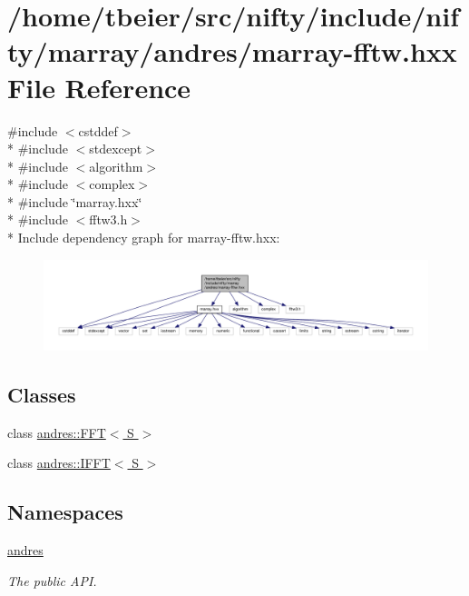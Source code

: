 \hypertarget{marray-fftw_8hxx}{}\section{/home/tbeier/src/nifty/include/nifty/marray/andres/marray-\/fftw.hxx File Reference}
\label{marray-fftw_8hxx}
{\ttfamily \#include $<$cstddef$>$}\\*
{\ttfamily \#include $<$stdexcept$>$}\\*
{\ttfamily \#include $<$algorithm$>$}\\*
{\ttfamily \#include $<$complex$>$}\\*
{\ttfamily \#include \char`\"{}marray.\+hxx\char`\"{}}\\*
{\ttfamily \#include $<$fftw3.\+h$>$}\\*
Include dependency graph for marray-\/fftw.hxx\+:\nopagebreak
\begin{figure}[H]
\begin{center}
\leavevmode
\includegraphics[width=350pt]{marray-fftw_8hxx__incl}
\end{center}
\end{figure}
\subsection*{Classes}
\begin{DoxyCompactItemize}
\item 
class \hyperlink{classandres_1_1FFT}{andres\+::\+F\+F\+T$<$ S $>$}
\item 
class \hyperlink{classandres_1_1IFFT}{andres\+::\+I\+F\+F\+T$<$ S $>$}
\end{DoxyCompactItemize}
\subsection*{Namespaces}
\begin{DoxyCompactItemize}
\item 
 \hyperlink{namespaceandres}{andres}
\begin{DoxyCompactList}\small\item\em The public A\+P\+I. \end{DoxyCompactList}\end{DoxyCompactItemize}
